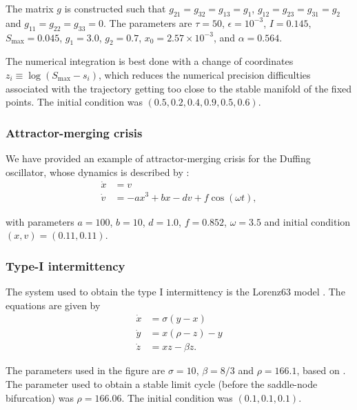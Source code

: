 The matrix $g$ is constructed such that $g_{21} = g_{32} = g_{13} = g_1$, $g_{12} = g_{23} = g_{31} = g_2$ and $g_{11} = g_{22} = g_{33} = 0$. The parameters are $\tau = 50$, $\epsilon = 10^{-3}$, $I = 0.145$, $S_\mathrm{max} = 0.045$, $g_1 = 3.0$, $g_2 = 0.7$, $x_0 = 2.57 \times 10^{-3}$, and $\alpha = 0.564$.

The numerical integration is best done with a change of coordinates $z_i \equiv \log(S_\mathrm{max} - s_i)$, which reduces the numerical precision difficulties associated with the trajectory getting too close to the stable manifold of the fixed points. The initial condition was $(0.5, 0.2, 0.4, 0.9, 0.5, 0.6)$. 


\subsubsection{Attractor-merging crisis}
We have provided an example of attractor-merging crisis for the Duffing oscillator, whose dynamics is described by \cite{ishii1986breakdown}: 
%
\begin{align}
    \dot{x} &= v \\ 
    \dot{v} &= -ax^3 + bx -dv + f \cos(\omega t), 
\end{align}

with parameters $a = 100$, $b = 10$, $d = 1.0$, $f = 0.852$, $\omega = 3.5$ and initial condition $(x,v) = (0.11, 0.11)$.

\subsubsection{Type-I intermittency}
The system used to obtain the type I intermittency is the Lorenz63 model \cite{lorenz1963deterministic}. The equations are given by 
\begin{align}
    \dot{x} &= \sigma(y - x) \\ 
    \dot{y} &= x(\rho - z) - y \\ 
    \dot{z} &= xz - \beta z. 
\end{align}

The parameters used in the figure are $\sigma = 10$, $\beta = 8/3$ and $\rho = 166.1$, based on \cite{yorke1979metastable}. The parameter used to obtain a stable limit cycle (before the saddle-node bifurcation) was $\rho = 166.06$. The initial condition was $(0.1, 0.1, 0.1)$. 


